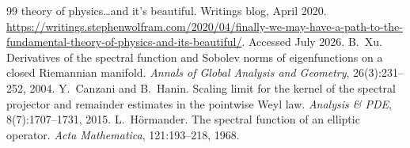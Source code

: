 \documentclass[11pt]{article}
\theoremstyle{remark}
\begin{document}
\begin{thebibliography}{99}
theory of physics\ldots and it's beautiful. Writings blog, April 2020.
\url{https://writings.stephenwolfram.com/2020/04/finally-we-may-have-a-path-to-the-fundamental-theory-of-physics-and-its-beautiful/}. Accessed July 2026.
 B.~Xu. Derivatives of the spectral function and Sobolev norms
of eigenfunctions on a closed Riemannian manifold. \emph{Annals of Global
Analysis and Geometry}, 26(3):231--252, 2004.
 Y.~Canzani and B.~Hanin. Scaling limit for the
kernel of the spectral projector and remainder estimates in the pointwise Weyl
law. \emph{Analysis \& PDE}, 8(7):1707--1731, 2015.
 L.~H\"ormander. The spectral function of an
elliptic operator. \emph{Acta Mathematica}, 121:193--218, 1968.
\end{thebibliography}
\end{document}

